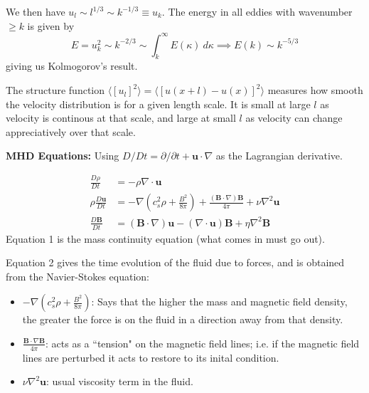 \documentclass[12pt,letterpaper]{article}
\newcommand{\B}[1]{\mathbf{#1}}
\begin{document}
  We then have $u_l\sim l^{1/3}\sim k^{-1/3} \equiv u_k$. The energy in all eddies with wavenumber $\geq k$  is given by
  $$
  E = u^2_k \sim k^{-2/3} \sim \int_k^\infty E(\kappa) \ d\kappa  \implies E(k) \sim k^{-5/3}
  $$
  giving us Kolmogorov's result.

  The structure function $\langle[u_l]^2 \rangle = \langle [u(x+l)-u(x)]^2\rangle$ measures how smooth the velocity distribution is for a given length scale. It is small at large $l$ as velocity is continous at that scale, and large at small $l$ as velocity can change appreciatively over that scale.

  \textbf{MHD Equations: }
  Using $D/Dt = \partial / \partial t + \B{u}\cdot\nabla$ as the Lagrangian derivative.

  \begin{align}
        \frac{D\rho}{Dt} &= -\rho \nabla\cdot\B{u} \\
        \rho \frac{D\B{u}}{Dt} &= -\nabla\left(c_s^2\rho + \frac{B^2}{8\pi}\right) + \frac{(\B{B}\cdot\nabla)\B{B}}{4\pi} + \nu \nabla^2 \B{u} \\
        \frac{D\B{B}}{Dt} &= (\B{B}\cdot\nabla)\B{u} - (\nabla\cdot\B{u})\B{B} + \eta \nabla^2\B{B}
  \end{align}
  Equation 1 is the mass continuity equation (what comes in must go out).

  Equation 2 gives the time evolution of the fluid due to forces, and is obtained from the Navier-Stokes equation:
  \begin{itemize}
    \item $-\nabla\left(c_s^2\rho + \frac{B^2}{8\pi}\right)$: Says that the higher the mass and magnetic field density, the greater the force is on the fluid in a direction away from that density.

    \item $\frac{\B{B}\cdot\nabla\B{B}}{4\pi}$: acts as a ``tension" on the magnetic field lines; i.e. if the magnetic field lines are perturbed it acts to restore to its inital condition.

    \item $\nu \nabla^2 \B{u}$: usual viscosity term in the fluid.
  \end{itemize}
\end{document}
